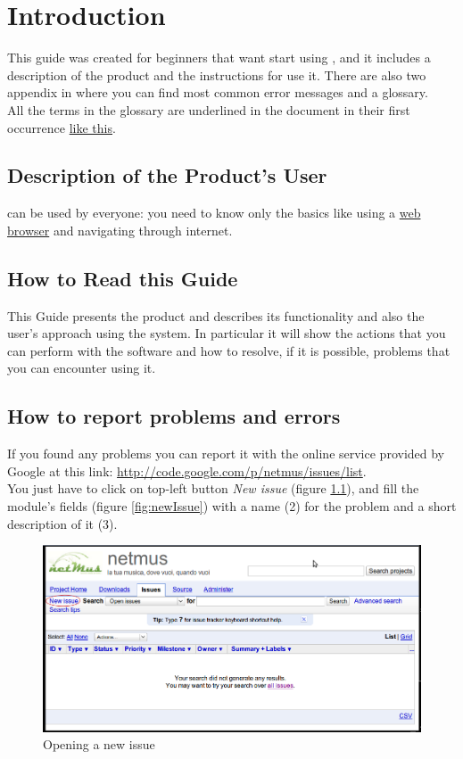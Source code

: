 \tableofcontents

\chapter{Introduction}
\thispagestyle{fancy} %
This guide was created for beginners that want start using , and it
includes a description of the product and the instructions for use it. There are
also two appendix in where you can find most common error messages and a
glossary.\\

All the terms in the glossary are underlined in the document in their first
occurrence \underline{like this}.

\section{Description of the Product's User}
 can be used by everyone: you need to know only the basics like using
a \underline{web browser} and navigating through internet. 


\section{How to Read this Guide}
This Guide presents the product  and describes its functionality and
also the user's approach using the system. In particular it will show the 
actions that you can perform with the software and how to resolve, if it is
possible, problems that you can encounter using it.

\section{How to report problems and errors}
If you found any problems you can report it with the online service provided by
Google at this link:  \url{http://code.google.com/p/netmus/issues/list}.\\
You just have to click on top-left button \emph{New issue} (figure
\ref{fig:issues}), and fill the module's
fields (figure \ref{fig:newIssue}) with a name (2) for the problem and a short description of it (3). 

\begin{figure}[!htbp]
  \centering
  \includegraphics[width=16cm]{img/MU/issues.png}
\caption{Opening a new issue}
\label{fig:issues}
\end{figure}


